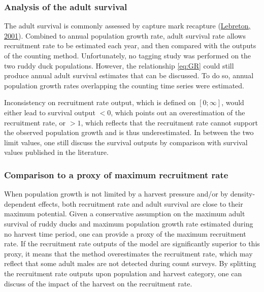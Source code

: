 \documentclass[
  english,
]{article}
\begin{document}
\hypertarget{analysis-of-the-adult-survival}{%
\subsubsection{Analysis of the adult survival}\label{analysis-of-the-adult-survival}}

The adult survival is commonly assessed by capture mark recapture (\protect\hyperlink{ref-Lebreton2001}{Lebreton, 2001}). Combined to annual population growth rate, adult survival rate allows recruitment rate to be estimated each year, and then compared with the outputs of the counting method. Unfortunately, no tagging study was performed on the two ruddy duck populations. However, the relationship \eqref{eq:GR} could still produce annual adult survival estimates that can be discussed. To do so, annual population growth rates overlapping the counting time series were estimated.

Inconsistency on recruitment rate output, which is defined on \([0;\infty]\), would either lead to survival output \(<0\), which points out an overestimation of the recruitment rate, or \(>1\), which reflects that the recruitment rate cannot support the observed population growth and is thus underestimated. In between the two limit values, one still discuss the survival outputs by comparison with survival values published in the literature.

\hypertarget{comparison-to-a-proxy-of-maximum-recruitment-rate}{%
\subsubsection{Comparison to a proxy of maximum recruitment rate}\label{comparison-to-a-proxy-of-maximum-recruitment-rate}}

When population growth is not limited by a harvest pressure and/or by density-dependent effects, both recruitment rate and adult survival are close to their maximum potential. Given a conservative assumption on the maximum adult survival of ruddy ducks and maximum population growth rate estimated during no harvest time period, one can provide a proxy of the maximum recruitment rate. If the recruitment rate outputs of the model are significantly superior to this proxy, it means that the method overestimates the recruitment rate, which may reflect that some adult males are not detected during count surveys. By splitting the recruitment rate outputs upon population and harvest category, one can discuss of the impact of the harvest on the recruitment rate.
\end{document}
